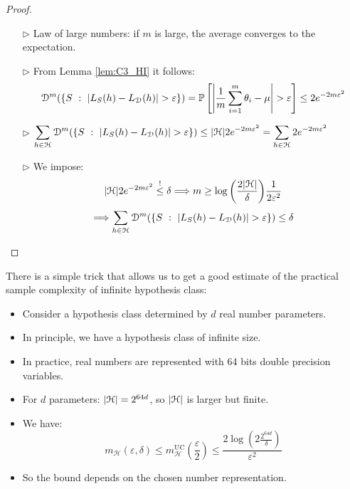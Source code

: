 \documentclass[../../main/main.tex]{subfiles}
\begin{document}
\begin{proof}
\begin{itemize}
        \item[$\triangleright$] Law of large numbers: if \( m \) is large, the average converges to the expectation.

        \item[$\triangleright$] From Lemma \ref{lem:C3_HI} it follows:
            \[
                \mathcal{D}^m (\{ S \ : \ \abs{L_S(h) - L_{\mathcal{D}}(h)} > \varepsilon \})
                =
                \mathbb{P}\left[ \abs{\frac{1}{m} \sum_{i=1}^{m} \theta_i - \mu } > \varepsilon \right]
                \le
                2 e^{-2m \varepsilon^2}
            \]

        \item[$\triangleright$]
            \( \displaystyle \sum_{h \in \mathcal{H}} \mathcal{D}^m (\{ S \ : \ \abs{L_S(h) - L_{\mathcal{D}}(h)} > \varepsilon \})
            \le
            \abs{\mathcal{H}} 2 e^{-2m \varepsilon^2}
            =
            \sum_{h \in \mathcal{H}} 2 e^{-2 m \varepsilon^2} \)

        \item[$\triangleright$] We impose:
            \[
                \abs{\mathcal{H}} 2 e^{-2m \varepsilon^2}
                \overset{!}{\le}
                \delta
                \Longrightarrow
                m
                \ge
                \log{\left( \frac{2 \abs{\mathcal{H}}}{\delta} \right)} \frac{1}{2 \varepsilon^2}
            \]
            \[
                \Longrightarrow
                \sum_{h \in \mathcal{H}} \mathcal{D}^m (\{ S \ : \ \abs{L_S(h) - L_{\mathcal{D}}(h)} > \varepsilon \})
                \le
                \delta
            \]
    \end{itemize}
\end{proof}

\begin{remark}
    There is a simple trick that allows us to get a good estimate of the practical sample complexity of infinite hypothesis class:
    \begin{itemize}
        \item Consider a hypothesis class determined by \( d \) real number parameters.
        \item In principle, we have a hypothesis class of infinite size.
        \item In practice, real numbers are represented with 64 bits double precision variables.
        \item For \( d \) parameters: \( \abs{\mathcal{H}} = 2^{64 d} \), so \( \abs{\mathcal{H}} \) is larger but finite.
        \item We have:
            \[
                m_{\mathcal{H}}(\varepsilon, \delta)
                \le
                m_{\mathcal{H}}^{\text{UC}} \left( \frac{\varepsilon}{2} \right)
                \le
                \frac{2 \log{\left( 2 \frac{2^{64d}}{\delta} \right)}}{\varepsilon^2}
            \]
        \item So the bound depends on the chosen number representation.
    \end{itemize}
\end{remark}
\end{document}
